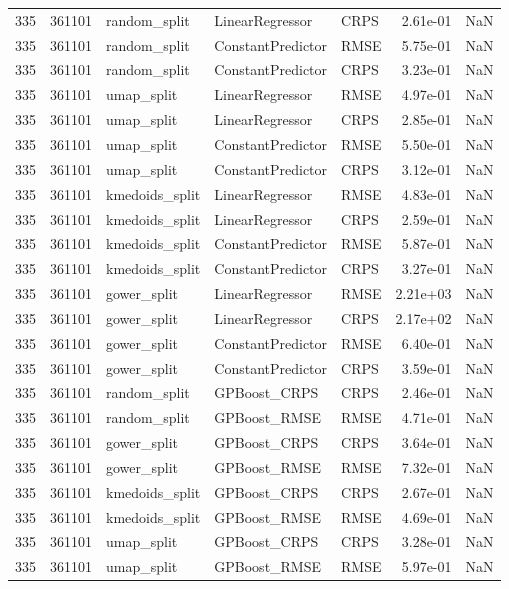 \begin{tabular}{rrlllrr}
335 & 361101 & random\_split & LinearRegressor & CRPS & 2.61e-01 & NaN \\
335 & 361101 & random\_split & ConstantPredictor & RMSE & 5.75e-01 & NaN \\
335 & 361101 & random\_split & ConstantPredictor & CRPS & 3.23e-01 & NaN \\
335 & 361101 & umap\_split & LinearRegressor & RMSE & 4.97e-01 & NaN \\
335 & 361101 & umap\_split & LinearRegressor & CRPS & 2.85e-01 & NaN \\
335 & 361101 & umap\_split & ConstantPredictor & RMSE & 5.50e-01 & NaN \\
335 & 361101 & umap\_split & ConstantPredictor & CRPS & 3.12e-01 & NaN \\
335 & 361101 & kmedoids\_split & LinearRegressor & RMSE & 4.83e-01 & NaN \\
335 & 361101 & kmedoids\_split & LinearRegressor & CRPS & 2.59e-01 & NaN \\
335 & 361101 & kmedoids\_split & ConstantPredictor & RMSE & 5.87e-01 & NaN \\
335 & 361101 & kmedoids\_split & ConstantPredictor & CRPS & 3.27e-01 & NaN \\
335 & 361101 & gower\_split & LinearRegressor & RMSE & 2.21e+03 & NaN \\
335 & 361101 & gower\_split & LinearRegressor & CRPS & 2.17e+02 & NaN \\
335 & 361101 & gower\_split & ConstantPredictor & RMSE & 6.40e-01 & NaN \\
335 & 361101 & gower\_split & ConstantPredictor & CRPS & 3.59e-01 & NaN \\
335 & 361101 & random\_split & GPBoost\_CRPS & CRPS & 2.46e-01 & NaN \\
335 & 361101 & random\_split & GPBoost\_RMSE & RMSE & 4.71e-01 & NaN \\
335 & 361101 & gower\_split & GPBoost\_CRPS & CRPS & 3.64e-01 & NaN \\
335 & 361101 & gower\_split & GPBoost\_RMSE & RMSE & 7.32e-01 & NaN \\
335 & 361101 & kmedoids\_split & GPBoost\_CRPS & CRPS & 2.67e-01 & NaN \\
335 & 361101 & kmedoids\_split & GPBoost\_RMSE & RMSE & 4.69e-01 & NaN \\
335 & 361101 & umap\_split & GPBoost\_CRPS & CRPS & 3.28e-01 & NaN \\
335 & 361101 & umap\_split & GPBoost\_RMSE & RMSE & 5.97e-01 & NaN \\

\end{tabular}
